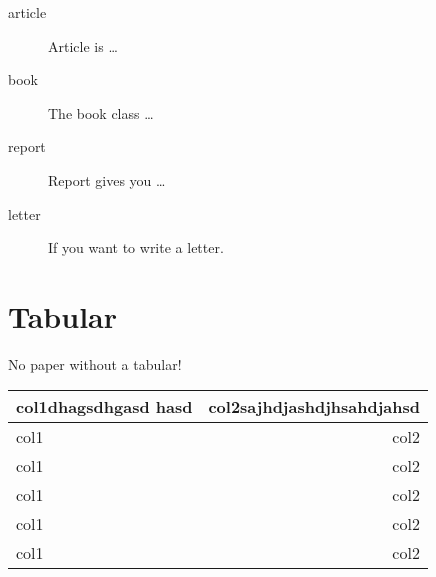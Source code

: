 \documentclass[12pt, a4paper, twoside, titlepage]{article}
\begin{document}

 \begin{description}
 	\item[article\label{article}] {Article is \ldots}
 	\item[book\label{book}]       {The book class \ldots}
 	\item[report\label{report}]   {Report gives you \ldots}
 	\item[letter\label{letter}]   {If you want to write a letter.}
 \end{description}

\section{Tabular}
No paper without a tabular!

\begin{tabular}{p{5cm}|r}
\hline
\hline
col1dhagsdhgasd hasd  & col2sajhdjashdjhsahdjahsd\\
\hline
col1  & col2\\
\hline
col1  & col2\\
\hline
col1  & col2\\
\hline
col1  & col2\\
\hline
col1  & col2\\
\hline
\hline
\end{tabular} 







% 
% 
\end{document}
